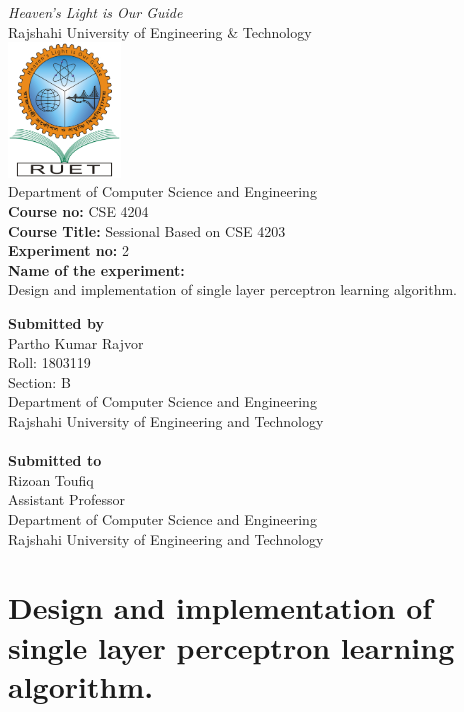 \begin{center}
    \textit{Heaven’s Light is Our Guide} \\
    \vspace{1cm}
    \Large{Rajshahi University of Engineering \& Technology} \\
    \vspace{1cm}
    \includegraphics[width=3cm]{ruet-logo.png}\\
    \vspace{0.1cm}
    \Large{Department of Computer Science and Engineering} \\
    \vspace{1cm}
    \large{\textbf{Course no:} CSE 4204} \\
    \large{\textbf{Course Title:} Sessional Based on CSE 4203} \\
    \large{\textbf{Experiment no:} 2}\\
    \large{\textbf{Name of the experiment:}} \\
    \large{Design and implementation of single layer
    perceptron learning algorithm.} \\
    \vspace{1cm}
\end{center}
\thispagestyle{empty}
\Large{\textbf{Submitted by}}\\
Partho Kumar Rajvor \\
Roll: 1803119 \\
Section: B \\
Department of Computer Science and Engineering\\
Rajshahi University of Engineering and Technology\\\\
\Large{\textbf{Submitted to}}\\
Rizoan Toufiq \\
Assistant Professor \\
Department of Computer Science and Engineering \\
Rajshahi University of Engineering and Technology
\tableofcontents

\setcounter{chapter}{1}
\chapter{Design and implementation of single layer
perceptron learning algorithm.}
